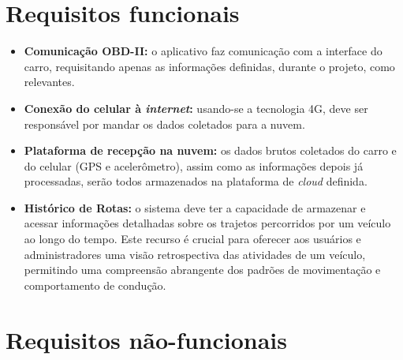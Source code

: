 \section{Requisitos funcionais}
\begin{itemize}
    \item \textbf{Comunicação OBD-II:} o aplicativo faz comunicação com a interface do carro, requisitando apenas as informações definidas, durante o projeto, como relevantes.
    
    \item \textbf{Conexão do celular à \textit{internet}:} usando-se a tecnologia 4G, deve ser responsável por mandar os dados coletados para a nuvem.
    
    \item \textbf{Plataforma de recepção na nuvem:} os dados brutos coletados do carro e do celular (GPS e acelerômetro), assim como as informações depois já processadas, serão todos armazenados na plataforma de \textit{cloud} definida.
    
    \item \textbf{Histórico de Rotas:} o sistema deve ter a capacidade de armazenar e acessar informações detalhadas sobre os trajetos percorridos por um veículo ao longo do tempo. Este recurso é crucial para oferecer aos usuários e administradores uma visão retrospectiva das atividades de um veículo, permitindo uma compreensão abrangente dos padrões de movimentação e comportamento de condução.
\end{itemize}

\section{Requisitos não-funcionais}

